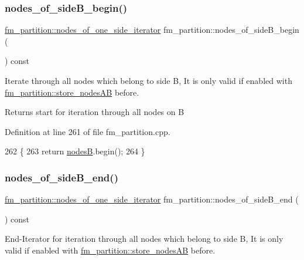 \subsubsection{\texorpdfstring{nodes\+\_\+of\+\_\+side\+B\+\_\+begin()}{nodes\_of\_sideB\_begin()}}
{\footnotesize\ttfamily \mbox{\hyperlink{classfm__partition_ad6cca73d48cc73d7bee1f52bf1c9a9fe}{fm\+\_\+partition\+::nodes\+\_\+of\+\_\+one\+\_\+side\+\_\+iterator}} fm\+\_\+partition\+::nodes\+\_\+of\+\_\+side\+B\+\_\+begin (\begin{DoxyParamCaption}{ }\end{DoxyParamCaption}) const}

Iterate through all nodes which belong to side {\ttfamily B}, It is only valid if enabled with \mbox{\hyperlink{classfm__partition_a8926005b4637055d2acf6f29ad2d9b97}{fm\+\_\+partition\+::store\+\_\+nodes\+AB}} before.

\begin{DoxyReturn}{Returns}
start for iteration through all nodes on {\ttfamily B} 
\end{DoxyReturn}


Definition at line 261 of file fm\+\_\+partition.\+cpp.


\begin{DoxyCode}
262 \{
263     \textcolor{keywordflow}{return} \mbox{\hyperlink{classfm__partition_a3616b858b66682c528365a4803a4efad}{nodesB}}.begin();
264 \}
\end{DoxyCode}
\mbox{\label{classfm__partition_a9682b070cce104bdfe69e576df57f560}} 
\subsubsection{\texorpdfstring{nodes\+\_\+of\+\_\+side\+B\+\_\+end()}{nodes\_of\_sideB\_end()}}
{\footnotesize\ttfamily \mbox{\hyperlink{classfm__partition_ad6cca73d48cc73d7bee1f52bf1c9a9fe}{fm\+\_\+partition\+::nodes\+\_\+of\+\_\+one\+\_\+side\+\_\+iterator}} fm\+\_\+partition\+::nodes\+\_\+of\+\_\+side\+B\+\_\+end (\begin{DoxyParamCaption}{ }\end{DoxyParamCaption}) const}

End-\/\+Iterator for iteration through all nodes which belong to side {\ttfamily B}, It is only valid if enabled with \mbox{\hyperlink{classfm__partition_a8926005b4637055d2acf6f29ad2d9b97}{fm\+\_\+partition\+::store\+\_\+nodes\+AB}} before.

